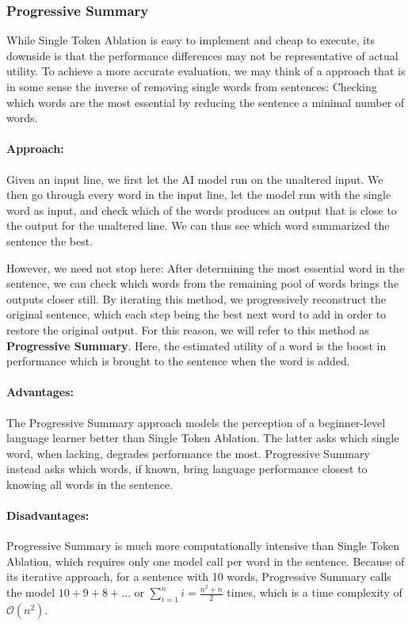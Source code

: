 \subsubsection{Progressive Summary}
While Single Token Ablation is easy to implement and cheap to execute, its downside is that the performance differences may not be representative of actual utility.
To achieve a more accurate evaluation, we may think of a approach that is in some sense the inverse of removing single words from sentences:
Checking which words are the most essential by reducing the sentence a minimal number of words.

\paragraph{Approach:}
Given an input line, we first let the AI model run on the unaltered input.
We then go through every word in the input line, let the model run with the single word as input, and check which of the words produces an output that is close to the output for the unaltered line.
We can thus see which word summarized the sentence the best.

However, we need not stop here:
After determining the most essential word in the sentence, we can check which words from the remaining pool of words brings the outputs closer still.
By iterating this method, we progressively reconstruct the original sentence, which each step being the best next word to add in order to restore the original output.
For this reason, we will refer to this method as \textbf{Progressive Summary}.
Here, the estimated utility of a word is the boost in performance which is brought to the sentence when the word is added.

\paragraph{Advantages:}
The Progressive Summary approach models the perception of a beginner-level language learner better than Single Token Ablation.
The latter asks which single word, when lacking, degrades performance the most.
Progressive Summary instead asks which words, if known, bring language performance closest to knowing all words in the sentence.

\paragraph{Disadvantages:}
Progressive Summary is much more computationally intensive than Single Token Ablation, which requires only one model call per word in the sentence.
Because of its iterative approach, for a sentence with 10 words, Progressive Summary calls the model $10+9+8+... $ or $\sum_{i=1}^{n}i = \frac{n^2 + n}{2}$ times, which is a time complexity of $\mathcal{O}(n^2)$.


